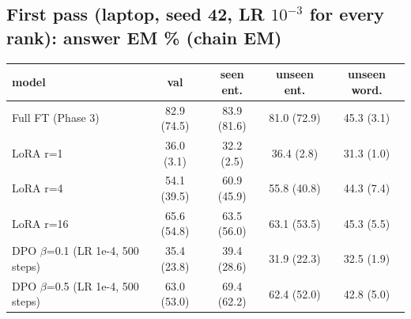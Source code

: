 \subsection*{First pass (laptop, seed 42, LR $10^{-3}$ for every rank): answer EM \% (chain EM)}
\begin{tabular}{lcccc}\toprule model & val & seen ent. & unseen ent. & unseen word.\\\midrule
Full FT (Phase 3) & 82.9 (74.5) & 83.9 (81.6) & 81.0 (72.9) & 45.3 (3.1)\\
LoRA r=1 & 36.0 (3.1) & 32.2 (2.5) & 36.4 (2.8) & 31.3 (1.0)\\
LoRA r=4 & 54.1 (39.5) & 60.9 (45.9) & 55.8 (40.8) & 44.3 (7.4)\\
LoRA r=16 & 65.6 (54.8) & 63.5 (56.0) & 63.1 (53.5) & 45.3 (5.5)\\
DPO $\beta$=0.1 (LR 1e-4, 500 steps) & 35.4 (23.8) & 39.4 (28.6) & 31.9 (22.3) & 32.5 (1.9)\\
DPO $\beta$=0.5 (LR 1e-4, 500 steps) & 63.0 (53.0) & 69.4 (62.2) & 62.4 (52.0) & 42.8 (5.0)\\
\bottomrule\end{tabular}

